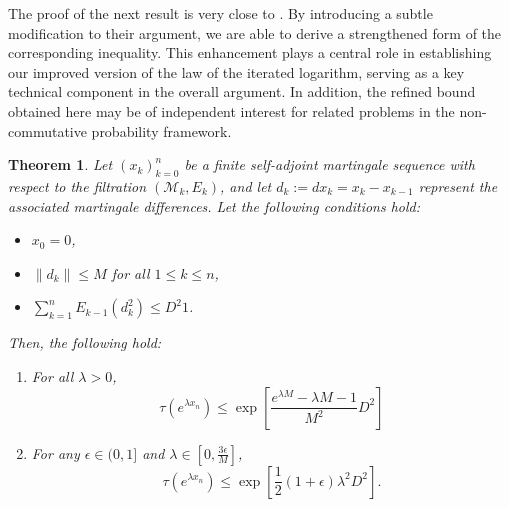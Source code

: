 \documentclass[10pt]{amsart}
\newtheorem{thm}{Theorem}[section]
\theoremstyle{definition}
\theoremstyle{myremark}
\numberwithin{equation}{section}
\begin{document}
The proof of the next result is  very close to \cite[Theorem 4.3]{randrianantoanina2024triple}. By introducing a subtle modification to their argument, we are able to derive a strengthened form of the corresponding inequality. This enhancement plays a central role in establishing our improved version of the law of the iterated logarithm, serving as a key technical component in the overall argument. In addition, the refined bound obtained here may be of independent interest for related problems in the non-commutative probability framework.


\begin{thm}\label{thm: exp ineq}
    Let $ (x_k)_{k=0}^n $ be a finite self-adjoint martingale sequence with respect to the filtration $ (\mathcal{M}_k, E_k) $, and let $ d_k := dx_k = x_k - x_{k-1} $ represent the associated martingale differences.  Let the following conditions hold:
\begin{itemize}
    \item[(i)] $x_0 = 0 $, 
    \item[(ii)] $ \|d_k\| \leq M $ for all $1 \leq k \leq n$,
   \item[(iii)] $ \sum_{k=1}^n E_{k-1}(d_k^2) \leq D^2 1 $.
\end{itemize}
 Then, the following hold:
\begin{enumerate}
    \item For all $\lambda>0$, 
    \[
    \tau\left( e^{\lambda x_n} \right) \leq \exp \left[ \frac{e^{\lambda M} - \lambda M -1}{M^2} D^2 \right]
    \]
    \item For any $ \epsilon \in (0, 1] $ and $ \lambda \in \left[ 0, \frac{3 \epsilon}{M} \right] $,
    \[
    \tau\left( e^{\lambda x_n} \right) \leq \exp\left[ \frac{1}{2} (1 + \epsilon) \lambda^2 D^2 \right].
    \]
\end{enumerate}

\end{thm}
\end{document}
